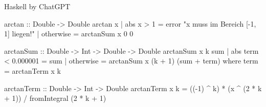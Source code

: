 \documentclass[aspectratio=169,usepdftitle=true,11pt,ngerman,t]{beamer}
\begin{document}
\begin{frame}[fragile]{Haskell by ChatGPT}
    \begin{plainhaskell}
arctan :: Double -> Double
arctan x
  | abs x > 1 = error "x muss im Bereich [-1, 1] liegen!"
  | otherwise = arctanSum x 0 0

arctanSum :: Double -> Int -> Double -> Double
arctanSum x k sum
  | abs term < 0.000001 = sum
  | otherwise = arctanSum x (k + 1) (sum + term)
  where
    term = arctanTerm x k

arctanTerm :: Double -> Int -> Double
arctanTerm x k = ((-1) ^ k) * (x ^ (2 * k + 1)) / fromIntegral (2 * k + 1)
    \end{plainhaskell}
\end{frame}
\end{document}
